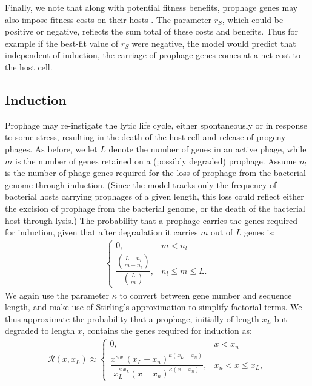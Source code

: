 Finally, we note that along with potential fitness benefits, prophage genes may also impose fitness costs on their hosts \citep{koonin_evolution_2009}.  The parameter $r_S$, which could be positive or negative, reflects the sum total of these costs and benefits.  Thus for example if the best-fit value of $r_S$ were negative, the model would predict that independent of induction, the carriage of prophage genes comes at a net cost to the host cell.

\subsection{Induction} \label{indu}
 Prophage may re-instigate the lytic life cycle, either spontaneously or in response to some stress, resulting in the death of the host cell and release of progeny phages.   As before, we let $L$ denote the number of genes in an active phage, while $m$ is the number of genes retained on a (possibly degraded) prophage.  Assume $n_l$ is the number of phage genes required for the loss of prophage from the bacterial genome through induction.  (Since the model tracks only the frequency of bacterial hosts carrying prophages of a given length, this loss could reflect either the excision of prophage from the bacterial genome, or the death of the bacterial host through lysis.)  The probability that a prophage carries the genes required for induction, given that after degradation it carries $m$ out of $L$ genes is:
\begin{eqnarray}
 \begin{cases} 
0, & m < n_l \\
\dfrac{\binom{L-n_l}{m-n_l}}{\binom{L}{m}},  & n_l \leq m \leq L.
\end{cases}\nonumber
\end{eqnarray}
We again use the parameter  $\kappa$ to convert between gene number and sequence length, and make use of  Stirling's approximation to simplify factorial terms.  We thus approximate the probability that a prophage, initially of length  $x_{L}$ but degraded to length $x$, contains the genes required for induction as:
\begin{eqnarray}
\mathcal{R}(x,x_L)\approx
 \begin{cases} 
0, & x < x_n \\
\dfrac{x^{\kappa \, x}\, (x_{L}-x_{n})^{\kappa (x_{L}-x_{n})}}{ x_{L}^{\kappa\, x_{L}}{(x- x_{n})}^{\kappa (x- x_{n})}},  &x_{n} < x \leq x_{L},
\end{cases}
\end{eqnarray}
